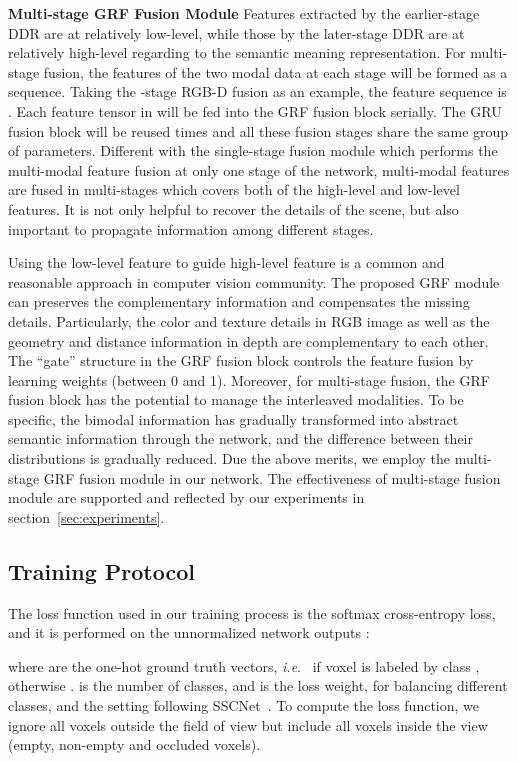 \documentclass[10pt,twocolumn,letterpaper]{article}
\def\ie{\emph{i.e}.} \def\Ie{\emph{I.e}.}
\begin{document}
\noindent
\textbf{Multi-stage GRF Fusion Module}
Features extracted by the earlier-stage DDR are at relatively low-level, while those by the later-stage DDR are at relatively high-level regarding to the semantic meaning representation. For multi-stage fusion, the features of the two modal data at each stage will be formed as a sequence.
Taking the -stage RGB-D fusion as an example, the feature sequence is 
.
Each feature tensor in  will be fed into the GRF fusion block serially.
The GRU fusion block will be reused  times and all these fusion stages share the same group of parameters.
Different with the single-stage fusion module which performs the multi-modal feature fusion at only one stage of the network, multi-modal features are fused in multi-stages which covers both of the high-level and low-level features.
It is not only helpful to recover the details of the scene, but also important to propagate information among different stages.

Using the low-level feature to guide high-level feature is a common and reasonable approach in computer vision community. The proposed GRF module can preserves the complementary information and compensates the missing details. Particularly, the color and texture details in RGB image as well as the geometry and distance information in depth are complementary to each other. The ``gate'' structure in the GRF fusion block controls the feature fusion by learning weights (between 0 and 1). Moreover, for multi-stage fusion, the GRF fusion block has the potential to manage the interleaved modalities. To be specific, the bimodal information has gradually transformed into abstract semantic information through the network, and the difference between their distributions is gradually reduced.
Due the above merits, we employ the multi-stage GRF fusion module in our network. The effectiveness of multi-stage fusion module are supported and reflected by our experiments in section~\ref{sec:experiments}.




\vspace{-0.1cm}
\subsection{Training Protocol}
The loss function used in our training process is the softmax cross-entropy loss, and it is performed on the unnormalized network outputs :

where  are the one-hot ground truth vectors, \ie~ if voxel  is labeled by class , otherwise .  is the number of classes, and  is the loss weight, for balancing different classes, and the setting following SSCNet~\cite{song2017_SSCNet}. 
To compute the loss function, we ignore all voxels outside the field of view but include all voxels inside the view (empty, non-empty and occluded voxels).
\end{document}
